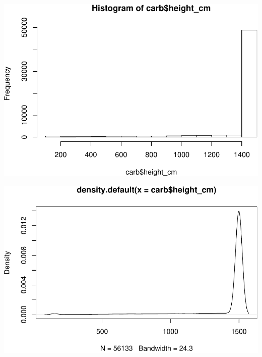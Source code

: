 \documentclass[]{article}
\newenvironment{Shaded}{\begin{snugshade}}{\end{snugshade}}
\newcommand{\CommentTok}[1]{\textcolor[rgb]{0.56,0.35,0.01}{\textit{#1}}}
\newcommand{\KeywordTok}[1]{\textcolor[rgb]{0.13,0.29,0.53}{\textbf{#1}}}
\newcommand{\NormalTok}[1]{#1}
\newcommand{\OperatorTok}[1]{\textcolor[rgb]{0.81,0.36,0.00}{\textbf{#1}}}
\newcommand{\StringTok}[1]{\textcolor[rgb]{0.31,0.60,0.02}{#1}}
\begin{document}
\includegraphics{R_tidyverse_for_geographers_files/figure-latex/unnamed-chunk-24-1.pdf}

\begin{Shaded}
\end{Shaded}

\includegraphics{R_tidyverse_for_geographers_files/figure-latex/unnamed-chunk-24-2.pdf}

\begin{Shaded}
\end{Shaded}
\end{document}
